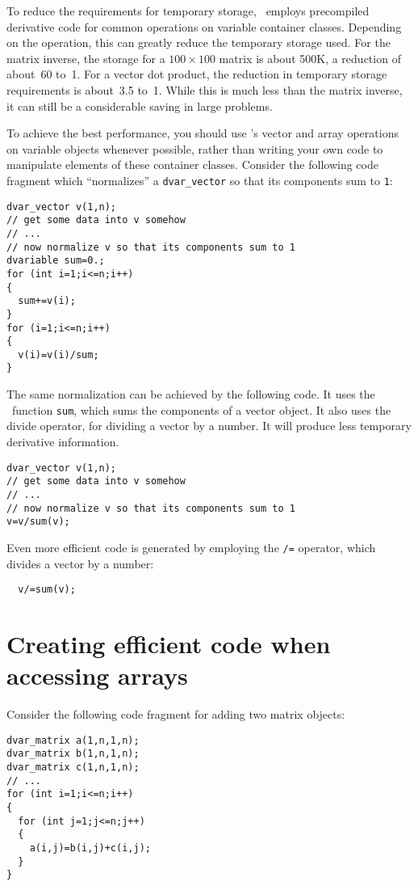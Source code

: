 \documentclass{admbmanual}
\begin{document}
To reduce the requirements for temporary storage, \scAD\ employs precompiled
derivative code for common operations on variable container classes. Depending
on the operation, this can greatly reduce the temporary storage used. For the
matrix inverse, the storage for a $100\times 100$ matrix is about 500K, a
reduction of about~60 to~1. For a vector dot product, the reduction in temporary
storage requirements is about~3.5 to~1. While this is much less than the matrix
inverse, it can still be a considerable saving in large problems.

To achieve the best performance, you should use \scAD's vector and array
operations on variable objects whenever possible, rather than writing your own
code to manipulate elements of these container classes. Consider the following
code fragment which ``normalizes'' a \texttt{dvar\_vector} so that its
components sum to \texttt{1}:
\begin{lstlisting}
dvar_vector v(1,n);
// get some data into v somehow
// ...
// now normalize v so that its components sum to 1
dvariable sum=0.;
for (int i=1;i<=n;i++)
{
  sum+=v(i);
}
for (i=1;i<=n;i++)
{
  v(i)=v(i)/sum;
}
\end{lstlisting}

The same normalization can be achieved by the following code. It uses the \scAD\
function \texttt{sum}, which sums the components of a vector object. It also
uses the divide operator, for dividing a vector by a number. It will produce
less temporary derivative information.
\begin{lstlisting}
dvar_vector v(1,n);
// get some data into v somehow
// ...
// now normalize v so that its components sum to 1
v=v/sum(v);
\end{lstlisting}

Even more efficient code is generated by employing the \texttt{/=} operator,
which divides a vector by a number:
\begin{lstlisting}
  v/=sum(v);
\end{lstlisting}


\section{Creating efficient code when accessing arrays}

Consider the following code fragment for adding two matrix objects:
\begin{lstlisting}
dvar_matrix a(1,n,1,n);
dvar_matrix b(1,n,1,n);
dvar_matrix c(1,n,1,n);
// ...
for (int i=1;i<=n;i++)
{
  for (int j=1;j<=n;j++)
  {
    a(i,j)=b(i,j)+c(i,j);
  }
}
\end{lstlisting}
\end{document}
